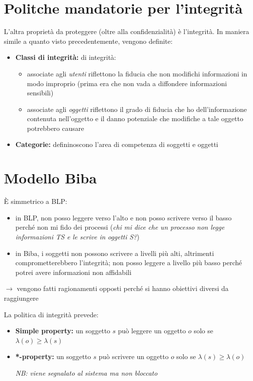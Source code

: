\documentclass{report}
\begin{document}
\section{Politche mandatorie per l'integrità}
L'altra proprietà da proteggere (oltre alla confidenzialità) è l'integrità. In 
maniera simile a quanto visto precedentemente, vengono definite:
\begin{itemize}
    \item \textbf{Classi di integrità:}
    di integrità:
    \begin{itemize}
        \item associate agli \textit{utenti} riflettono la fiducia che non modifichi
        informazioni in modo improprio (prima era che non vada a diffondere informazioni sensibili)
        \item associate agli \textit{oggetti} riflettono il grado di fiducia che ho dell'informazione 
        contenuta nell'oggetto e il danno potenziale che modifiche a tale oggetto potrebbero causare
    \end{itemize}
    \item \textbf{Categorie:} defininoscono l'area di competenza di soggetti e oggetti 
\end{itemize}

\section{Modello Biba}
È simmetrico a BLP:
\begin{itemize}
    \item in BLP, non posso leggere verso l'alto e non posso scrivere verso il basso 
    perché non mi fido dei processi (\textit{chi mi dice che un processo non legge informazioni 
    TS e le scrive in oggetti S?})
    \item in Biba, i soggetti non possono scrivere a livelli più alti, altrimenti comprometterebbero 
    l'integrità; non posso leggere a livello più basso perché potrei avere informazioni non affidabili
\end{itemize}

$\rightarrow$ vengono fatti ragionamenti opposti perché si hanno obiettivi diversi da raggiungere

\noindent La politica di integrità prevede:
\begin{itemize}
    \item \textbf{Simple property:} un soggetto $s$ può leggere un oggetto $o$ solo 
    se $\lambda(o) \geq \lambda(s)$
    \item \textbf{*-property:} un soggetto $s$ può scrivere un oggetto $o$ solo se $\lambda(s) \geq \lambda(o)$
    
    \textit{NB: viene segnalato al sistema ma non bloccato}
\end{itemize}
\end{document}
